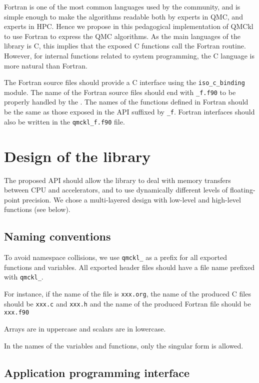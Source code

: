Fortran is one of the most common languages used by the community, and
is simple enough to make the algorithms readable both by experts in
\ac{QMC}, and experts in \ac{HPC}. Hence we propose in this
pedagogical implementation of \ac{QMCkl} to use Fortran to express the
QMC algorithms. As the main languages of the library is C, this
implies that the exposed C functions call the Fortran routine.
However, for internal functions related to system programming, the C
language is more natural than Fortran.

The  Fortran  source  files  should provide  a  C  interface  using the
\texttt{iso_c_binding} module. The name of the Fortran source files
should end with \texttt{_f.f90} to be properly handled by the
{\Makefile}.  The names of the functions defined in Fortran should be the
same as those exposed in the \ac{API} suffixed by \texttt{_f}.
Fortran interfaces should also be written in the
\texttt{qmckl_f.f90} file.

\section{Design of the library}

The proposed \ac{API} should allow the library to deal with memory
transfers between CPU and accelerators, and to use dynamically
different levels of floating-point precision.  We chose a
multi-layered design with low-level and high-level functions (see
below).

\subsection{Naming conventions}

To avoid namespace collisions, we use \texttt{qmckl_} as a prefix for
all exported functions and variables.  All exported header files
should have a file name prefixed with \texttt{qmckl_}.

For instance, if the name of the {\orgmode} file is
\texttt{xxx.org}, the name of the produced C files should
be \texttt{xxx.c} and \texttt{xxx.h} and the
name of the produced Fortran file should be
\texttt{xxx.f90}

Arrays are in uppercase and scalars are in lowercase.

In the  names of  the variables and  functions, only the singular
form is allowed.

\subsection{Application programming interface}

